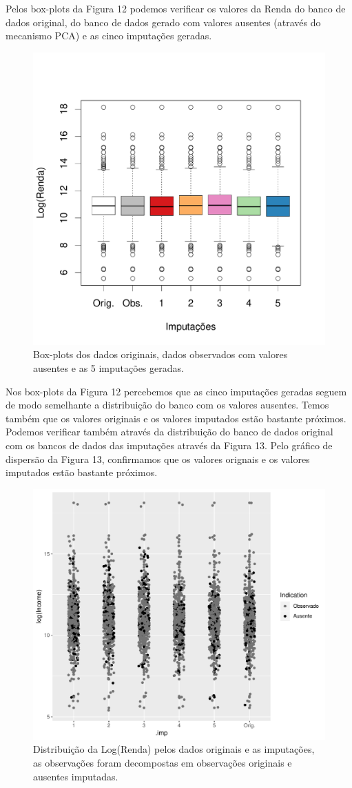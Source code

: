 \documentclass[]{article}
\begin{document}
Pelos box-plots da Figura 12 podemos verificar os valores da Renda do
banco de dados original, do banco de dados gerado com valores ausentes
(através do mecanismo PCA) e as cinco imputações geradas.

\begin{figure}[H]

{\centering \includegraphics[width=0.6\linewidth]{p57-graf} 

}

\caption{Box-plots dos dados originais, dados observados com valores ausentes e as 5 imputações geradas.}\label{fig:unnamed-chunk-20}
\end{figure}

Nos box-plots da Figura 12 percebemos que as cinco imputações geradas
seguem de modo semelhante a distribuição do banco com os valores
ausentes. Temos também que os valores originais e os valores imputados
estão bastante próximos. Podemos verificar também através da
distribuição do banco de dados original com os bancos de dados das
imputações através da Figura 13. Pelo gráfico de dispersão da Figura 13,
confirmamos que os valores orignais e os valores imputados estão
bastante próximos.

\begin{figure}[H]

{\centering \includegraphics[width=0.6\linewidth]{Relatorio_IC_files/figure-latex/unnamed-chunk-21-1} 

}

\caption{Distribuição da Log(Renda) pelos dados originais e as imputações, as observações foram decompostas em observações originais e ausentes imputadas.}\label{fig:unnamed-chunk-21}
\end{figure}
\end{document}
